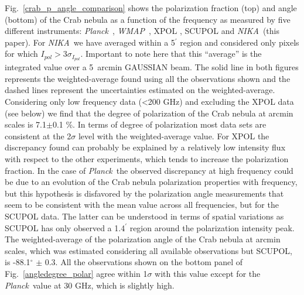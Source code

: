 \documentclass[twocolumn,traditabstract]{aa}
\def\NIKA{\textit{NIKA}}
\def\Planck{\textit{Planck}}
\def\WMAP{\textit{WMAP}}
\begin{document}
Fig.~\ref{crab_p_angle_comparison} shows the polarization fraction (top) and
angle (bottom) of the Crab nebula as a function of the frequency as measured by
five different instruments: \Planck\ \citep{2015arXiv150702058P},
\WMAP\ \citep{2011ApJS..192...19W}, XPOL \citep{aumont2010}, SCUPOL
\citep{scubapol} and \NIKA\ (this paper).  For \NIKA\ we have averaged within a
5$^\prime$ region and considered only pixels for which $I_{pol} > 3\sigma_{I_{pol}}$. Important to note here that this ``average'' is the
  integrated value over a 5~arcmin GAUSSIAN beam.
The solid line in both figures represents the weighted-average found using all
the observations shown and the dashed lines represent the uncertainties
estimated on the weighted-average. Considering only low frequency data
(\textless 200 GHz) and excluding the XPOL data (see below) we find that the
degree of polarization of the Crab nebula at arcmin scales is 7.1$\pm$0.1 \%.
In terms of degree of polarization most data sets are consistent at the
2$\sigma$ level with the weighted-average value. For XPOL the discrepancy found
can probably be explained by a relatively low intensity flux with respect to the
other experiments, which tends to increase the polarization fraction. In the
case of \Planck\, the observed discrepancy at high frequency could be due to an
evolution of the Crab nebula polarization properties with frequency, but
this hypothesis is disfavored by the polarization angle measurements that seem
to be consistent with the mean value across all frequencies, but for the SCUPOL
data. The latter can be understood in terms of spatial variations as SCUPOL has
only observed a 1.4$^\prime$ region around the polarization intensity peak. The
weighted-average of the polarization angle of the Crab nebula at arcmin scales,
which was estimated considering all available observations but SCUPOL, is -88.1$^{\circ}$
$\pm$ 0.3.  All the observations shown on the bottom panel of
Fig.~\ref{angledegree_polar} agree within 1$\sigma$ with this value except for
the \Planck\ value at 30 GHz, which is slightly high.
\end{document}
